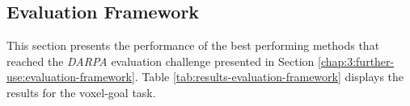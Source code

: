 \newpage
\subsection{Evaluation Framework}
This section presents the performance of the best performing methods that reached the \textit{DARPA} evaluation challenge presented in Section \ref{chap:3:further-use:evaluation-framework}. Table \ref{tab:results-evaluation-framework} displays the results for the voxel-goal task.


